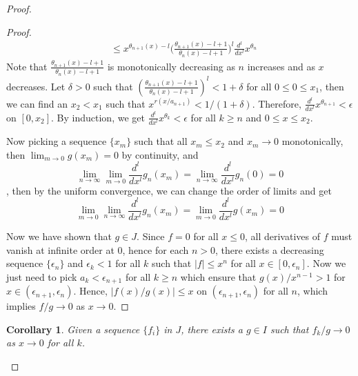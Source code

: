 \documentclass[12pt]{amsart}
\newtheorem{cor}[thm]{Corollary}
\theoremstyle{definition}
\theoremstyle{remark}
\numberwithin{equation}{section}
\newcommand{\1}{{\mathbb{1}}}
\begin{document}
\begin{proof}
\begin{proof}
\begin{align*}
 				& \le x^{\theta_{n+1}(x) - l}  \Bigg(\frac{\theta_{n+1}(x)-l+1}{\theta_{n}(x)-l+1} \Bigg)^l \frac{d^l}{dx^l} x^{\theta_{n}}   
 			\end{align*}
 		    Note that $\frac{\theta_{n+1}(x)-l+1}{\theta_{n}(x)-l+1}$ is monotonically decreasing as $n$ increases and as $x$ decreases. Let $\delta >0$ such that $(\frac{\theta_{n+1}(x)-l+1}{\theta_{n}(x)-l+1})^l < 1+\delta$ for all $0\le 0 \le x_1$, then we can find an $x_2<x_1$ such that $x^{r(x/a_{n+1})} <1/(1+\delta)$. Therefore, $\frac{d^l}{dx^l} x^{\theta_{n+1}} < \epsilon$ on $[0, x_2]$. By induction, we get  $\frac{d^l}{dx^l} x^{\theta_{k}} < \epsilon$ for all $k\ge n$ and $0\le x \le x_2$. 
 		    
 		    Now picking a sequence $\{x_m\}$ such that all $x_m \le x_2$ and $x_m \to 0$ monotonically, then $\lim_{m\to 0} g(x_m) = 0$ by continuity, and 
 		    $$
 		    \lim_{n\to \infty}\lim_{m\to 0}\frac{d^l}{dx^l}g_n(x_m) = \lim_{n\to \infty}\frac{d^l}{dx^l}g_n(0) = 0
 		    $$,
 		    then by the uniform convergence, we can change the order of limits and get
 			$$
 			\lim_{m\to 0}\lim_{n\to \infty}\frac{d^l}{dx^l}g_n(x_m) = \lim_{m\to 0}\frac{d^l}{dx^l}g(x_m) = 0
 			$$
 			
 			Now we have shown that $g\in J$. Since $f=0$ for all $x\le 0$, all derivatives of $f$ must vanish at infinite order at $0$, hence for each $n>0$, there exists a decreasing sequence $\{\epsilon_n\}$ and $\epsilon_k <1$ for all $k$ such that $|f|\le x^{n}$ for all $x\in [0, \epsilon_n]$. Now we just need to pick $a_k < \epsilon_{n+1}$ for all $k\ge n$ which ensure that $g(x)/x^{n-1}>1$ for $x \in (\epsilon_{n+1},\epsilon_n)$. Hence, $|f(x)/g(x)| \le x $  on $(\epsilon_{n+1},\epsilon_n)$ for all $n$, which implies $f/g \to 0$ as $x \to 0$.
 			
 	
% 			
% 			
% 			
 			\end{proof}
 		\begin{cor}
 			Given a sequence $\{f_i\}$ in $J$, there exists a $g\in I$ such that $f_k/g \to 0$ as $x \to 0$ for all $k$.
 		\end{cor}
 	

\end{proof}
\end{document}
